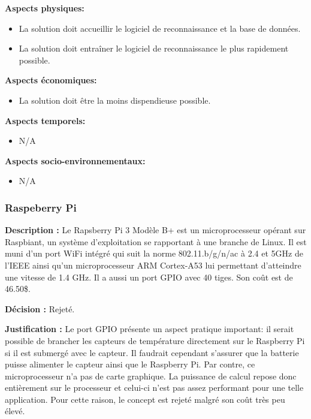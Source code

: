 \textbf{Aspects physiques:}
\begin{itemize}[label = {--}]
    \item La solution doit accueillir le logiciel de reconnaissance et la base de données.
    \item La solution doit entraîner le logiciel de reconnaissance le plus rapidement possible.
\end{itemize}

\textbf{Aspects économiques:}
\begin{itemize}[label = {--}]
    \item La solution doit être la moins dispendieuse possible.
\end{itemize}

\textbf{Aspects temporels:}
\begin{itemize}[label = {--}]
    \item N/A
\end{itemize}

\textbf{Aspects socio-environnementaux:}
\begin{itemize}[label = {--}]
    \item N/A
\end{itemize}

\subsubsection{Raspeberry Pi}

\textbf{Description :} Le Rapsberry Pi 3 Modèle B+ est un microprocesseur opérant sur Raspbiant, un système d'exploitation se rapportant à une branche de Linux. Il est muni d'un port WiFi intégré qui suit la norme 802.11.b/g/n/ac à 2.4 et 5GHz de l'IEEE ainsi qu'un microprocesseur ARM Cortex-A53 lui permettant d'atteindre une vitesse de 1.4 GHz. Il a aussi un port GPIO avec 40 tiges. Son coût est de 46.50\$.

\textbf{Décision :} Rejeté.

\textbf{Justification :}  Le port GPIO présente un aspect pratique important: il serait possible de brancher les capteurs de température directement sur le Raspberry Pi si il est submergé avec le capteur. Il faudrait cependant s'assurer que la batterie puisse alimenter le capteur ainsi que le Raspberry Pi. Par contre, ce microprocesseur n'a pas de carte graphique. La puissance de calcul repose donc entièrement sur le processeur et celui-ci n'est pas assez performant pour une telle application. Pour cette raison, le concept est rejeté malgré son coût très peu élevé.

